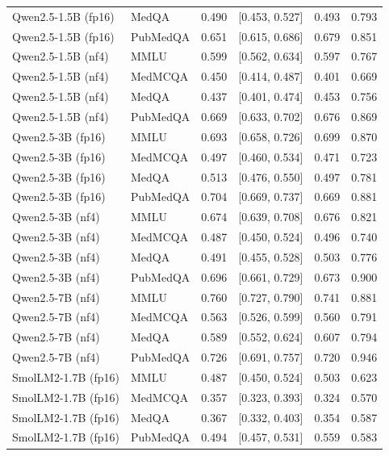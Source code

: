 \documentclass[11pt]{article}
\theoremstyle{plain}
\theoremstyle{definition}
\begin{document}
{\begin{longtable}{llcccc}
Qwen2.5-1.5B (fp16) & MedQA & 0.490 & {[0.453, 0.527]} & 0.493 & 0.793 \\
Qwen2.5-1.5B (fp16) & PubMedQA & 0.651 & {[0.615, 0.686]} & 0.679 & 0.851 \\
\midrule
Qwen2.5-1.5B (nf4) & MMLU & 0.599 & {[0.562, 0.634]} & 0.597 & 0.767 \\
Qwen2.5-1.5B (nf4) & MedMCQA & 0.450 & {[0.414, 0.487]} & 0.401 & 0.669 \\
Qwen2.5-1.5B (nf4) & MedQA & 0.437 & {[0.401, 0.474]} & 0.453 & 0.756 \\
Qwen2.5-1.5B (nf4) & PubMedQA & 0.669 & {[0.633, 0.702]} & 0.676 & 0.869 \\
\midrule
Qwen2.5-3B (fp16) & MMLU & 0.693 & {[0.658, 0.726]} & 0.699 & 0.870 \\
Qwen2.5-3B (fp16) & MedMCQA & 0.497 & {[0.460, 0.534]} & 0.471 & 0.723 \\
Qwen2.5-3B (fp16) & MedQA & 0.513 & {[0.476, 0.550]} & 0.497 & 0.781 \\
Qwen2.5-3B (fp16) & PubMedQA & 0.704 & {[0.669, 0.737]} & 0.669 & 0.881 \\
\midrule
Qwen2.5-3B (nf4) & MMLU & 0.674 & {[0.639, 0.708]} & 0.676 & 0.821 \\
Qwen2.5-3B (nf4) & MedMCQA & 0.487 & {[0.450, 0.524]} & 0.496 & 0.740 \\
Qwen2.5-3B (nf4) & MedQA & 0.491 & {[0.455, 0.528]} & 0.503 & 0.776 \\
Qwen2.5-3B (nf4) & PubMedQA & 0.696 & {[0.661, 0.729]} & 0.673 & 0.900 \\
\midrule
Qwen2.5-7B (nf4) & MMLU & 0.760 & {[0.727, 0.790]} & 0.741 & 0.881 \\
Qwen2.5-7B (nf4) & MedMCQA & 0.563 & {[0.526, 0.599]} & 0.560 & 0.791 \\
Qwen2.5-7B (nf4) & MedQA & 0.589 & {[0.552, 0.624]} & 0.607 & 0.794 \\
Qwen2.5-7B (nf4) & PubMedQA & 0.726 & {[0.691, 0.757]} & 0.720 & 0.946 \\
\midrule
SmolLM2-1.7B (fp16) & MMLU & 0.487 & {[0.450, 0.524]} & 0.503 & 0.623 \\
SmolLM2-1.7B (fp16) & MedMCQA & 0.357 & {[0.323, 0.393]} & 0.324 & 0.570 \\
SmolLM2-1.7B (fp16) & MedQA & 0.367 & {[0.332, 0.403]} & 0.354 & 0.587 \\
SmolLM2-1.7B (fp16) & PubMedQA & 0.494 & {[0.457, 0.531]} & 0.559 & 0.583 \\
\end{longtable}}
\end{document}

